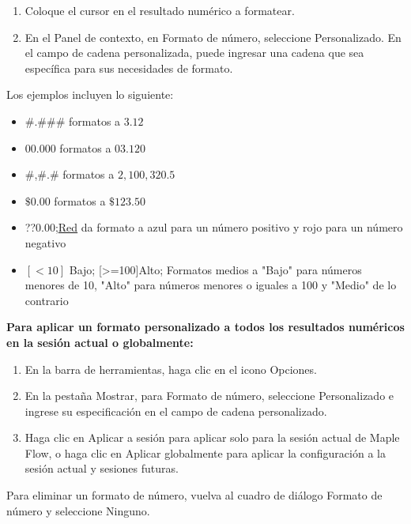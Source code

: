 \begin{enumerate}
  \item Coloque el cursor en el resultado numérico a formatear.

\item En el Panel de contexto, en Formato de número, seleccione Personalizado. En el campo de cadena personalizada, puede ingresar una cadena que sea específica para sus necesidades de formato.
\end{enumerate}

Los ejemplos incluyen lo siguiente:
\begin{itemize}
  \item \#.\#\#\# formatos a $3.12$

\item $00.000$ formatos a $03.120$

\item \#,\#.\# formatos a $2,100,320.5$

\item $\$ 0.00$ formatos a $\$ 123.50$

\item??0.00;\href{??0.00}{Red} da formato a azul para un número positivo y rojo para un número negativo

\item $[<10]$ Bajo; [>=100]Alto; Formatos medios a "Bajo" para números menores de 10, "Alto" para números menores o iguales a 100 y "Medio" de lo contrario
\end{itemize}

\textbf{Para aplicar un formato personalizado a todos los resultados numéricos en la sesión actual o globalmente:}
\begin{enumerate}
  \item En la barra de herramientas, haga clic en el icono Opciones. 

\item En la pestaña Mostrar, para Formato de número, seleccione Personalizado e ingrese su especificación en el campo de cadena personalizado.

\item Haga clic en Aplicar a sesión para aplicar solo para la sesión actual de Maple Flow, o haga clic en Aplicar globalmente para aplicar la configuración a la sesión actual y sesiones futuras.
\end{enumerate}

Para eliminar un formato de número, vuelva al cuadro de diálogo Formato de número y seleccione Ninguno.

